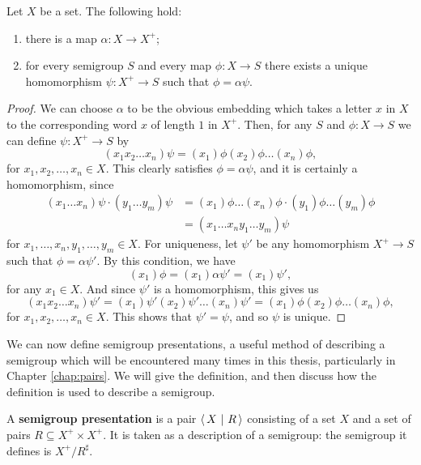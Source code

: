 \begin{proposition}
  \label{prop:free}
  Let $X$ be a set.  The following hold:
  \begin{enumerate}
  \item there is a map $\alpha: X \to X^+$;
  \item for every semigroup $S$ and every map $\phi: X \to S$ there exists a
    unique homomorphism $\psi: X^+ \to S$ such that $\phi = \alpha\psi$.
  \end{enumerate}
  \begin{proof}
    We can choose $\alpha$ to be the obvious embedding which takes a letter $x$
    in $X$ to the corresponding word $x$ of length $1$ in $X^+$.  Then, for any
    $S$ and $\phi: X \to S$ we can define $\psi: X^+ \to S$ by
    $$(x_1 x_2 \ldots x_n)\psi = (x_1)\phi (x_2)\phi \ldots (x_n)\phi,$$
    for $x_1, x_2, \ldots, x_n \in X$.  This clearly satisfies
    $\phi = \alpha\psi$, and it is certainly a homomorphism, since
    \begin{align*}
      (x_1 \ldots x_n)\psi \cdot (y_1 \ldots y_m)\psi
      & = (x_1)\phi\ldots(x_n)\phi \cdot (y_1)\phi\ldots(y_m)\phi \\
      & = (x_1 \ldots x_ny_1 \ldots y_m)\psi
    \end{align*}
    for $x_1, \ldots, x_n, y_1, \ldots, y_m \in X$.  For uniqueness, let $\psi'$
    be any homomorphism $X^+ \to S$ such that $\phi = \alpha\psi'$.  By this
    condition, we have
    $$(x_1)\phi = (x_1)\alpha\psi' = (x_1)\psi',$$
    for any $x_1 \in X$.  And since $\psi'$ is a homomorphism, this gives us
    $$(x_1x_2\ldots x_n)\psi'
    = (x_1)\psi'(x_2)\psi'\ldots(x_n)\psi'
    = (x_1)\phi (x_2)\phi \ldots(x_n)\phi,$$
    for $x_1, x_2, \ldots, x_n \in X$.
    This shows that $\psi' = \psi$, and so $\psi$ is unique.
  \end{proof}
\end{proposition}

We can now define semigroup presentations, a useful method of describing a
semigroup which will be encountered many times in this thesis, particularly in
Chapter \ref{chap:pairs}.  We will give the definition, and then discuss how the
definition is used to describe a semigroup.

\begin{definition}
  \label{def:presentation}
  A \textbf{semigroup presentation} is a pair $\left\langle\,X ~\middle|~ R\,\right\rangle$ consisting of a set
  $X$ and a set of pairs $R \subseteq X^+ \times X^+$.  It is taken as a
  description of a semigroup: the semigroup it defines is $X^+ / R^\sharp$.
\end{definition}

